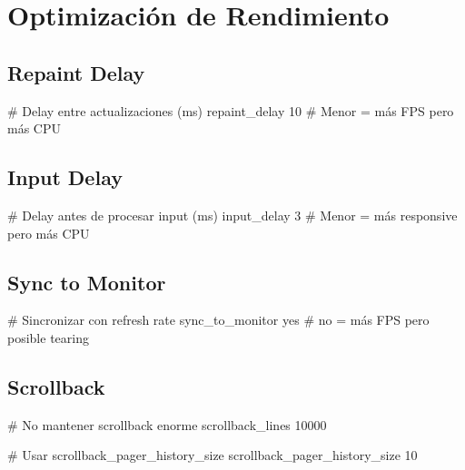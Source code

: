 \documentclass[
  doc,
  floatsintext,
  longtable,
  a4paper,
  nolmodern,
  notxfonts,
  notimes,
  12pt,
  colorlinks=true,linkcolor=blue,citecolor=blue,urlcolor=blue]{apa7}
\newenvironment{Shaded}{\begin{snugshade}}{\end{snugshade}}
\newcommand{\CommentTok}[1]{\textcolor[rgb]{0.37,0.37,0.37}{#1}}
\newcommand{\DataTypeTok}[1]{\textcolor[rgb]{0.68,0.00,0.00}{#1}}
\begin{document}
\section{Optimización de
Rendimiento}\label{optimizaciuxf3n-de-rendimiento}

\subsection{Repaint Delay}\label{repaint-delay}

\begin{Shaded}
\begin{Highlighting}[]
\CommentTok{\# Delay entre actualizaciones (ms)}
\DataTypeTok{repaint\_delay} \DataTypeTok{10}
\CommentTok{\# Menor = más FPS pero más CPU}
\end{Highlighting}
\end{Shaded}

\subsection{Input Delay}\label{input-delay}

\begin{Shaded}
\begin{Highlighting}[]
\CommentTok{\# Delay antes de procesar input (ms)}
\DataTypeTok{input\_delay} \DataTypeTok{3}
\CommentTok{\# Menor = más responsive pero más CPU}
\end{Highlighting}
\end{Shaded}

\subsection{Sync to Monitor}\label{sync-to-monitor}

\begin{Shaded}
\begin{Highlighting}[]
\CommentTok{\# Sincronizar con refresh rate}
\DataTypeTok{sync\_to\_monitor} \DataTypeTok{yes}
\CommentTok{\# no = más FPS pero posible tearing}
\end{Highlighting}
\end{Shaded}

\subsection{Scrollback}\label{scrollback-1}

\begin{Shaded}
\begin{Highlighting}[]
\CommentTok{\# No mantener scrollback enorme}
\DataTypeTok{scrollback\_lines} \DataTypeTok{10000}

\CommentTok{\# Usar scrollback\_pager\_history\_size}
\DataTypeTok{scrollback\_pager\_history\_size} \DataTypeTok{10}
\end{Highlighting}
\end{Shaded}
\end{document}
